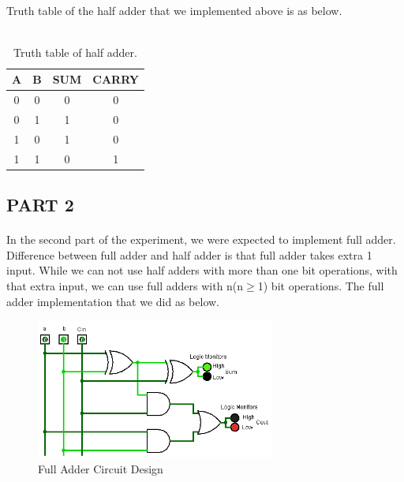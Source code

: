 \documentclass[pdftex,12pt,a4paper]{article}
\begin{document}
\paragraph{}
Truth table of the half adder that we implemented above is as below.\\\\

\begin{table}[hbt!]
\centering
    \begin{tabular}{|c|c|c|c|}
        \hline
         A & B & SUM & CARRY \\
         \hline
         0 & 0 & 0 & 0 \\
         \hline
         0 & 1 & 1 & 0 \\
         \hline
         1 & 0 & 1 & 0 \\
         \hline
         1 & 1 & 0 & 1 \\
         \hline
    \end{tabular}
    \caption{Truth table of half adder.}
    \label{table_half}
\end{table}

\clearpage
\subsection{PART 2}

\paragraph{}
In the second part of the experiment, we were expected to implement full adder. Difference between full adder and half adder is that full adder takes extra 1 input. While we can not use half adders with more than one bit operations, with that extra input, we can use full adders with n(n$\geq$1) bit operations. The full adder implementation that we did as below.\newline

\begin{figure}[!h]
	\centering
	\includegraphics[width=0.7\textwidth]{part2.png}	
	\caption{Full Adder Circuit Design}
	\label{Full Adder}
\end{figure}
\end{document}
